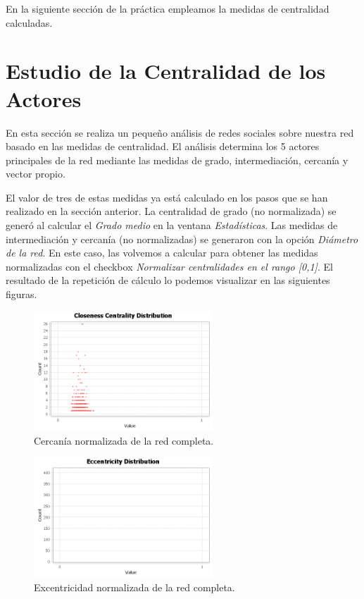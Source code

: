 \documentclass{uimppracticas}
\begin{document}
En la siguiente sección de la práctica empleamos la medidas de centralidad calculadas.

\newpage

\section*{Estudio de la Centralidad de los Actores}

En esta sección se realiza un pequeño análisis de redes sociales sobre nuestra red basado en las medidas de centralidad. El análisis determina los 5 actores principales de la red mediante las medidas de grado, intermediación, cercanía y vector propio.

El valor de tres de estas medidas ya está calculado en los pasos que se han realizado en la sección anterior. La centralidad de grado (no normalizada) se generó al calcular el \textit{Grado medio} en la ventana \textit{Estadísticas}. Las medidas de intermediación y cercanía (no normalizadas) se generaron con la opción \textit{Diámetro de la red}. En este caso, las volvemos a calcular para obtener las medidas normalizadas con el checkbox \textit{Normalizar centralidades en el rango [0,1]}. El resultado de la repetición de cálculo lo podemos visualizar en las siguientes figuras.

\begin{figure}[H]
	\centering
	\includegraphics[width=0.6\textwidth]{images/Closeness-Centrality-Distribution-Norm}
	\caption{Cercanía normalizada de la red completa.}
	\label{Closeness-Centrality-Distribution-Norm}
\end{figure}

\begin{figure}[H]
	\centering
	\includegraphics[width=0.6\textwidth]{images/Eccentricity-Distribution-Norm}
	\caption{Excentricidad normalizada de la red completa.}
	\label{Eccentricity-Distribution-Norm}
\end{figure}
\end{document}
